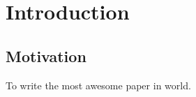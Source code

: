 \chapter{Introduction}\label{chp:intro}

\section{Motivation}
To write the most awesome paper in world.